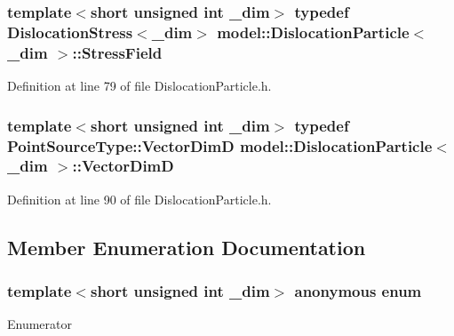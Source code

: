 \hypertarget{structmodel_1_1_dislocation_particle_a11c4d91265aef10567dc83b869e06fd5}{}
\subsubsection[{Stress\+Field}]{\setlength{\rightskip}{0pt plus 5cm}template$<$short unsigned int \+\_\+dim$>$ typedef {\bf Dislocation\+Stress}$<$\+\_\+dim$>$ {\bf model\+::\+Dislocation\+Particle}$<$ \+\_\+dim $>$\+::{\bf Stress\+Field}}\label{structmodel_1_1_dislocation_particle_a11c4d91265aef10567dc83b869e06fd5}


Definition at line 79 of file Dislocation\+Particle.\+h.

\hypertarget{structmodel_1_1_dislocation_particle_ac31483dc9c0a9aef3dde10fa00583b39}{}
\subsubsection[{Vector\+Dim\+D}]{\setlength{\rightskip}{0pt plus 5cm}template$<$short unsigned int \+\_\+dim$>$ typedef Point\+Source\+Type\+::\+Vector\+Dim\+D {\bf model\+::\+Dislocation\+Particle}$<$ \+\_\+dim $>$\+::{\bf Vector\+Dim\+D}}\label{structmodel_1_1_dislocation_particle_ac31483dc9c0a9aef3dde10fa00583b39}


Definition at line 90 of file Dislocation\+Particle.\+h.



\subsection{Member Enumeration Documentation}
\hypertarget{structmodel_1_1_dislocation_particle_a4bd5db323619f407d2eaa5a87db2037e}{}\subsubsection[{anonymous enum}]{\setlength{\rightskip}{0pt plus 5cm}template$<$short unsigned int \+\_\+dim$>$ anonymous enum}\label{structmodel_1_1_dislocation_particle_a4bd5db323619f407d2eaa5a87db2037e}
\begin{Desc}
\item[Enumerator]\par
\begin{description}
\item[{\em 
\hypertarget{structmodel_1_1_dislocation_particle_a4bd5db323619f407d2eaa5a87db2037eafe66120ebb7ec585463b43b9b7b9be22}{}dim\label{structmodel_1_1_dislocation_particle_a4bd5db323619f407d2eaa5a87db2037eafe66120ebb7ec585463b43b9b7b9be22}
}]\end{description}
\end{Desc}


